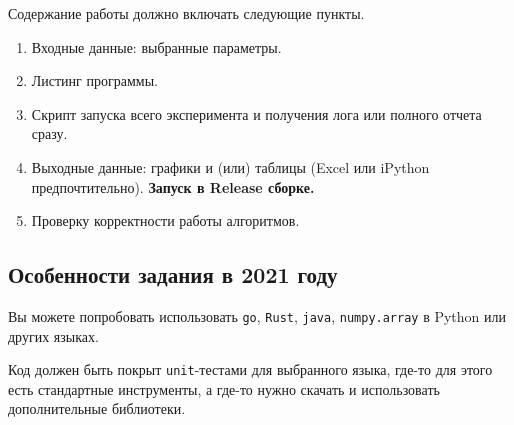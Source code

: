 Содержание работы должно включать следующие пункты.
\begin{enumerate}
    \item Входные данные: выбранные параметры.
    \item Листинг программы.
    \item Скрипт запуска всего эксперимента и получения лога или полного отчета сразу.
    \item Выходные данные: графики и (или) таблицы (Excel или iPython предпочтительно). \textbf{Запуск в Release сборке.}
    \item Проверку корректности работы алгоритмов.
\end{enumerate}

\subsection*{Особенности задания в 2021 году}
Вы можете попробовать использовать \texttt{go}, \texttt{Rust}, \texttt{java}, \texttt{numpy.array} в Python или других языках.

Код должен быть покрыт \texttt{unit}-тестами для выбранного языка, где-то для этого есть стандартные инструменты, а где-то нужно скачать и использовать дополнительные библиотеки.
